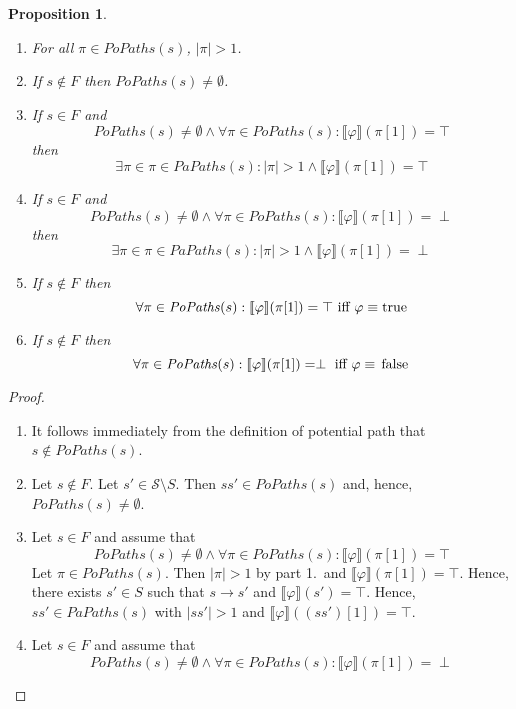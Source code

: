 \documentclass[12pt]{article}
\newcommand{\TRUE}{\mbox{\lstinline{true}}}
\newcommand{\FALSE}{\mbox{\lstinline{false}}}
\newtheorem{proposition}{Proposition}
\theoremstyle{definition}
\newcommand{\satisfaction}[1]{\llbracket #1 \rrbracket}
\newenvironment{franck}{\color{red}}{\color{black}}
\begin{document}
\begin{franck}
\begin{proposition}\ 
\begin{enumerate}
\item 
For all $\pi \in \mathit{PoPaths}(s)$, $|\pi| > 1$.
\item
If $s \not\in F$ then $\mathit{PoPaths}(s) \not= \emptyset$.
\item
If $s \in F$ and 
\[
\mathit{PoPaths}(s) \not= \emptyset \wedge \forall \pi \in \mathit{PoPaths}(s) : \satisfaction{\varphi}(\pi[1]) = \top
\]
then
\[
\exists \pi \in \pi \in \mathit{PaPaths}(s) : |\pi| > 1 \wedge \satisfaction{\varphi}(\pi[1]) = \top
\]
\item
If $s \in F$ and 
\[
\mathit{PoPaths}(s) \not= \emptyset \wedge \forall \pi \in \mathit{PoPaths}(s) : \satisfaction{\varphi}(\pi[1]) = \perp
\]
then
\[
\exists \pi \in \pi \in \mathit{PaPaths}(s) : |\pi| > 1 \wedge \satisfaction{\varphi}(\pi[1]) = \perp
\]
\item
If $s \not\in F$ then 
\[
\forall \pi \in \mathit{PoPaths}(s) : \satisfaction{\varphi}(\pi[1]) = \top
\mbox{ iff }
\varphi \equiv \TRUE
\]
\item
If $s \not\in F$ then 
\[
\forall \pi \in \mathit{PoPaths}(s) : \satisfaction{\varphi}(\pi[1]) = \perp
\mbox{ iff }
\varphi \equiv \FALSE
\]
\end{enumerate}
\end{proposition}
\begin{proof}\
\begin{enumerate}
\item
It follows immediately from the definition of potential path that $s \not\in \mathit{PoPaths}(s)$.
\item
Let $s \not\in F$.  Let $s' \in \mathcal{S} \setminus S$.  Then $s s' \in \mathit{PoPaths}(s)$ and, hence, $\mathit{PoPaths}(s) \not= \emptyset$. 
\item 
Let $s \in F$ and assume that
\[
\mathit{PoPaths}(s) \not= \emptyset \wedge \forall \pi \in \mathit{PoPaths}(s) : \satisfaction{\varphi}(\pi[1]) = \top
\]
Let $\pi \in \mathit{PoPaths}(s)$.  Then $|\pi| > 1$ by part 1.\ and $\satisfaction{\varphi}(\pi[1]) = \top$.  Hence, there exists $s' \in S$ such that $s \rightarrow s'$ and $\satisfaction{\varphi}(s') = \top$.  Hence, $s s' \in \mathit{PaPaths}(s)$ with $|s s'| > 1$ and $\satisfaction{\varphi}((s s')[1]) = \top$.
\item 
Let $s \in F$ and assume that
\[
\mathit{PoPaths}(s) \not= \emptyset \wedge \forall \pi \in \mathit{PoPaths}(s) : \satisfaction{\varphi}(\pi[1]) = \perp
\]
\end{enumerate}
\end{proof}
\end{franck}
\end{document}
